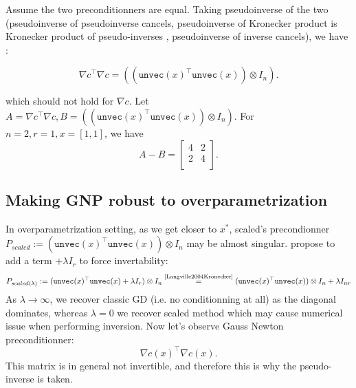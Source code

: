 \documentclass{article}
\begin{document}
Assume the two preconditionners are equal. Taking pseudoinverse of the two (pseudoinverse of pseudoinverse cancels, pseudoinverse of Kronecker product is Kronecker product of pseudo-inverses \cite{Langville2004Kronecker}, pseudoinverse of inverse cancels), we have :

$$
\nabla c^\top \nabla c = ((\texttt{unvec}(x)^\top \texttt{unvec}(x))\otimes I_{n}).
$$

which should not hold for $\nabla c$. Let $A=\nabla c^\top \nabla c, B =((\texttt{unvec}(x)^\top \texttt{unvec}(x))\otimes I_{n})$. For $n=2,r=1, x= [1,1]$, we have
$$
A - B =    \left[ {\begin{array}{cc}
   4 & 2 \\
   2 & 4 \\
  \end{array} } \right].
$$



\subsection{Making GNP robust to overparametrization}
In overparametrization setting, as we get closer to $x^*$, scaled's precondionner $P_{scaled}:=(\texttt{unvec}(x)^\top \texttt{unvec}(x))\otimes I_{n}$ may be almost singular.  \cite{xu2023power} propose to add a term $+\lambda I_{r}$ to force invertability: 
$$P_{scaled(\lambda)}:=(\texttt{unvec}(x)^\top \texttt{unvec}(x) + \lambda I_r)\otimes I_{n} \overset{\text{\cite{Langville2004Kronecker}}}{=} (\texttt{unvec}(x)^\top \texttt{unvec}(x) ) \otimes I_n + \lambda I_{nr}
$$
As $\lambda \to \infty$,  we recover classic GD (i.e. no conditionning at all) as the diagonal dominates, whereas $\lambda = 0$ we recover scaled method which may cause numerical issue when performing inversion. Now let's observe Gauss Newton preconditionner:
$$
\nabla c(x)^\top \nabla c(x).
$$
This matrix is in general not invertible, and therefore this is why the pseudo-inverse is taken. 


\subsection{}




\end{document}
